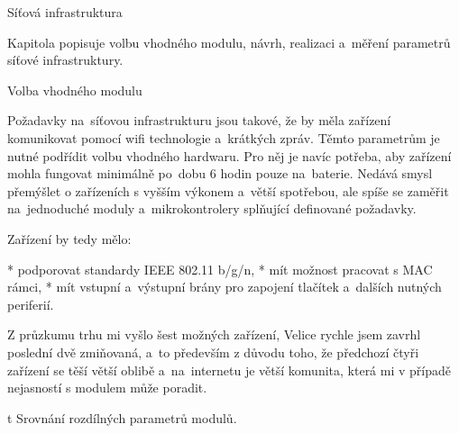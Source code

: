 
\def\ctustyle{{\ssr CTUstyle}}
\def\ttb{\tt\char`\\} %

\chap Síťová infrastruktura

Kapitola popisuje volbu vhodného modulu, návrh, realizaci a~měření parametrů síťové infrastruktury.

\sec Volba vhodného modulu

Požadavky na~síťovou infrastrukturu jsou takové, že by měla zařízení komunikovat pomocí wifi technologie a~krátkých zpráv. Těmto parametrům je nutné podřídit volbu vhodného hardwaru. Pro něj je navíc potřeba, aby zařízení mohla fungovat minimálně po~dobu 6 hodin pouze na~baterie. Nedává smysl přemýšlet o zařízeních s vyšším výkonem a~větší spotřebou, ale spíše se zaměřit na~jednoduché moduly a~mikrokontrolery splňující definované požadavky.

Zařízení by tedy mělo:

\begitems
* podporovat standardy IEEE 802.11 b/g/n,
* mít možnost pracovat s MAC rámci,
* mít vstupní a~výstupní brány pro zapojení tlačítek a~dalších nutných periferií.

\enditems

Z průzkumu trhu mi vyšlo šest možných zařízení, Velice rychle jsem zavrhl poslední dvě zmiňovaná, a~to především z důvodu toho, že předchozí čtyři zařízení se těší větší oblibě a~na~internetu je větší komunita, která mi v případě nejasností s modulem může poradit.

\midinsert {}
\caption/t Srovnání rozdílných parametrů modulů.
\endinsert

